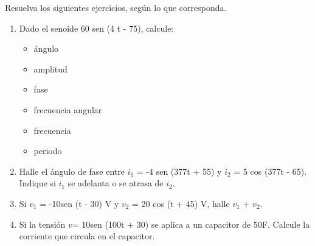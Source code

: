 \documentclass[12pt]{article}
\begin{document}

\noindent Resuelva los siguientes ejercicios, según lo que corresponda. 
\begin{enumerate}
\item Dado el senoide 60 sen (4 \si{\pi}t - 75), calcule:
\begin{itemize} 
    \item  ángulo
    \item  amplitud
    \item  fase
    \item  frecuencia angular
    \item  frecuencia
    \item  periodo
    \end{itemize}
    
\item Halle el ángulo de fase entre $i_1$ = -4 sen (377t + 55) y  $i_2$ = 5 cos (377t - 65). Indique si $i_1$ se adelanta o se atrasa de $i_2$.

\item Si $v_1$ = -10sen (\si{\omega}t - 30) V y $v_2$ = 20 cos (\si{\omega}t + 45) V, halle $v_1$ + $v_2$.

\item Si la tensión $v$= 10sen (100t + 30) se aplica a un capacitor de 50\si{\mu}F. Calcule la corriente que circula en el capacitor.


\end{enumerate}
\end{document}
